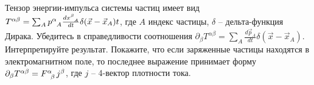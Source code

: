\documentclass[__main__.tex]{subfiles}
\begin{document}
Тензор энергии-импульса системы частиц имеет вид $T^{\alpha\beta}=\sum_{A}p\indices{^\alpha_A}\frac{dx\indices{^\beta_A}}{dt}\delta(\vec{x}-\vec{x}_A)t$, где $A$ индекс частицы, $\delta$ -- дельта-функция Дирака. Убедитесь в справедливости соотношения $\partial_{\beta}T^{\alpha\beta}=\sum_{A}\frac{d\vec{p}_A}{dt}\delta(\vec{x}-\vec{x}_A)$. Интерпретируйте результат. Покажите, что если заряженные частицы находятся в электромагнитном поле, то последнее выражение принимает форму $\partial_{\beta}T\indices{^\alpha^\beta}=F\indices{^\alpha_\beta}j^\beta$, где $j$ -- 4-вектор плотности тока.\\ 

\end{document}

